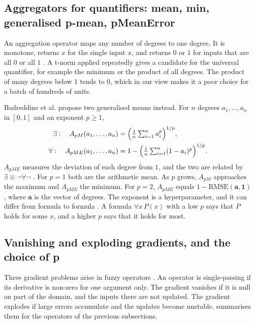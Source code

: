 \subsection{Aggregators for quantifiers: mean, min, generalised p-mean, pMeanError}
\label{sec:aggregators}

An aggregation operator maps any number of degrees to one degree. It is
monotone, returns $x$ for the single input $x$, and returns $0$ or $1$ for
inputs that are all $0$ or all $1$ \citep{badreddine2022ltn}. A t-norm applied
repeatedly gives a candidate for the universal quantifier, for example the
minimum or the product of all degrees. The product of many degrees below $1$
tends to $0$, which in our view makes it a poor choice for a batch of hundreds
of units.

Badreddine et al. propose two generalised means instead. For $n$ degrees
$a_1,\dots,a_n$ in $[0,1]$ and an exponent $p\geq 1$,
\begin{align}
\exists:\quad A_{pM}(a_1,\dots,a_n) &=
  \Bigl(\tfrac{1}{n}\textstyle\sum_{i=1}^{n} a_i^{p}\Bigr)^{1/p}, \\
\forall:\quad A_{pME}(a_1,\dots,a_n) &=
  1-\Bigl(\tfrac{1}{n}\textstyle\sum_{i=1}^{n}(1-a_i)^{p}\Bigr)^{1/p}.
\end{align}
$A_{pME}$ measures the deviation of each degree from $1$, and the two are
related by $\exists\equiv\neg\forall\neg$ \citep{badreddine2022ltn}. For $p=1$
both are the arithmetic mean. As $p$ grows, $A_{pM}$ approaches the maximum
and $A_{pME}$ the minimum. For $p=2$, $A_{pME}$ equals
$1-\mathrm{RMSE}(\mathbf{a},\mathbf{1})$, where $\mathbf{a}$ is the vector of
degrees. The exponent is a hyperparameter, and it can differ from formula to
formula \citep{badreddine2022ltn}. A formula $\forall x\,P(x)$ with a low $p$
says that $P$ holds for some $x$, and a higher $p$ says that it holds for most.

\subsection{Vanishing and exploding gradients, and the choice of p}
\label{sec:gradient-problems}

Three gradient problems arise in fuzzy operators \citep{badreddine2022ltn}. An
operator is single-passing if its derivative is non-zero for one argument
only. The gradient vanishes if it is null on part of the domain, and the
inputs there are not updated. The gradient explodes if large errors
accumulate and the updates become unstable. 
summarises them for the operators of the previous subsections.


